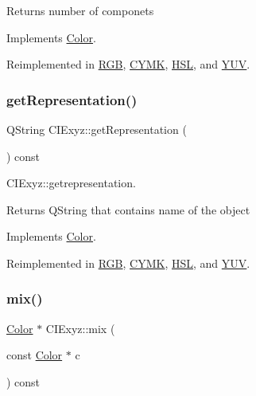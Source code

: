 \begin{DoxyReturn}{Returns}
number of componets 
\end{DoxyReturn}


Implements \hyperlink{class_color}{Color}.



Reimplemented in \hyperlink{class_r_g_b_a7561d57d6706bc25ea10762d906b2345}{R\+GB}, \hyperlink{class_c_y_m_k_ab3f005a1cc28f715192ad4fc90ded6b8}{C\+Y\+MK}, \hyperlink{class_h_s_l_a6e582f5779c1b5f84abe8bb182a868d0}{H\+SL}, and \hyperlink{class_y_u_v_a46eded5c13a0c2b2e9bbf05d4a2f9c7c}{Y\+UV}.

\mbox{\label{class_c_i_exyz_a19120c15d1304696909d76fae6065ebd}} 
\subsubsection{\texorpdfstring{get\+Representation()}{getRepresentation()}}
{\footnotesize\ttfamily Q\+String C\+I\+Exyz\+::get\+Representation (\begin{DoxyParamCaption}{ }\end{DoxyParamCaption}) const\hspace{0.3cm}{\ttfamily [virtual]}}



C\+I\+Exyz\+::getrepresentation. 

\begin{DoxyReturn}{Returns}
Q\+String that contains name of the object 
\end{DoxyReturn}


Implements \hyperlink{class_color}{Color}.



Reimplemented in \hyperlink{class_r_g_b_a5f7a68904e1e4f18c22c1066170fb2bf}{R\+GB}, \hyperlink{class_c_y_m_k_aa523f734fd52f67ca9fcb31f0b7fe579}{C\+Y\+MK}, \hyperlink{class_h_s_l_a774dc0a5dad87bc9ff44956af4873602}{H\+SL}, and \hyperlink{class_y_u_v_ae38403ffd397003eb28ab7670f95d1e5}{Y\+UV}.

\mbox{\label{class_c_i_exyz_af8eeb48ade44beea43d023b36d263fc8}} 
\subsubsection{\texorpdfstring{mix()}{mix()}}
{\footnotesize\ttfamily \hyperlink{class_color}{Color} $\ast$ C\+I\+Exyz\+::mix (\begin{DoxyParamCaption}\item[{const \hyperlink{class_color}{Color} $\ast$}]{c }\end{DoxyParamCaption}) const\hspace{0.3cm}{\ttfamily [virtual]}}



